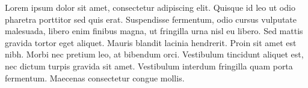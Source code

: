 Lorem ipsum dolor sit amet, consectetur adipiscing elit. Quisque id leo ut odio
pharetra porttitor sed quis erat. Suspendisse fermentum, odio cursus vulputate
malesuada, libero enim finibus magna, ut fringilla urna nisl eu libero. Sed
mattis gravida tortor eget aliquet. Mauris blandit lacinia hendrerit. Proin sit
amet est nibh. Morbi nec pretium leo, at bibendum orci. Vestibulum tincidunt
aliquet est, nec dictum turpis gravida sit amet. Vestibulum interdum fringilla
quam porta fermentum. Maecenas consectetur congue mollis.


